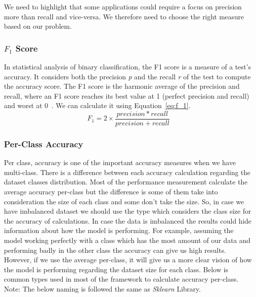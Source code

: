 We need to highlight that some applications could require a focus on precision more than recall and vice-versa. We therefore need to choose the right measure based on our problem.
 
\subsubsection{$F_1$ Score}
In statistical analysis of binary classification, the F1 score is a measure of a test's accuracy. It considers both the precision \textit{p} and the recall \textit{r} of the test to compute the accuracy score. The F1 score is the harmonic average of the precision and recall, where an F1 score reaches its best value at 1 (perfect precision and recall) and worst at 0~\cite{Wiki_f1_score}. We can calculate it using Equation~\eqref{eq:f_1}.%
\begin{equation}\label{eq:f_1}
F_1= 2 \times \frac{precision*recall}{precision+recall}
\end{equation}%
 
\subsubsection{Per-Class Accuracy}

Per class, accuracy is one of the important accuracy measures when we have multi-class. There is a difference between each accuracy calculation regarding the dataset classes distribution. Most of the performance measurement calculate the average accuracy per-class but the difference is some of them take into consideration the size of each class and some don’t take the size. So, in case we have imbalanced dataset we should use the type which considers the class size for the accuracy of calculations. In case the data is imbalanced the results could hide information about how the model is performing. For example, assuming the model working perfectly with a class which has the most amount of our data and performing badly in the other class the accuracy can give us high results. However, if we use the average per-class, it will give us a more clear vision of how the model is performing regarding the dataset size for each class. Below is common types used in most of the framework to calculate accuracy per-class. Note: The below naming is followed the same as \textit{Sklearn} Library.

